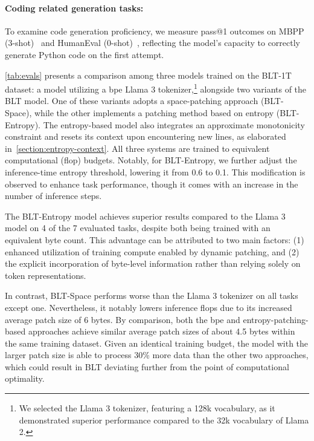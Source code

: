 \paragraph{Coding related generation tasks:}  To examine code generation proficiency, we measure pass@1 outcomes on MBPP (3-shot)~\citep{Eval_MBPP} and HumanEval (0-shot)~\citep{Eval_HumanEval}, reflecting the model's capacity to correctly generate Python code on the first attempt.

\autoref{tab:evals} presents a comparison among three models trained on the {\textsc BLT}-1T dataset: a model utilizing a bpe Llama 3 tokenizer,\footnote{We selected the Llama 3 tokenizer, featuring a 128k vocabulary, as it demonstrated superior performance compared to the 32k vocabulary of Llama 2.} alongside two variants of the {\textsc BLT} model. One of these variants adopts a space-patching approach ({\textsc BLT}-Space), while the other implements a patching method based on entropy ({\textsc BLT}-Entropy). The entropy-based model also integrates an approximate monotonicity constraint and resets its context upon encountering new lines, as elaborated in~\autoref{section:entropy-context}. All three systems are trained to equivalent computational (flop) budgets. Notably, for {\textsc BLT}-Entropy, we further adjust the inference-time entropy threshold, lowering it from 0.6 to 0.1. This modification is observed to enhance task performance, though it comes with an increase in the number of inference steps.

The {\textsc BLT}-Entropy model achieves superior results compared to the Llama 3 model on 4 of the 7 evaluated tasks, despite both being trained with an equivalent byte count. This advantage can be attributed to two main factors: (1) enhanced utilization of training compute enabled by dynamic patching, and (2) the explicit incorporation of byte-level information rather than relying solely on token representations.

In contrast, {\textsc BLT}-Space performs worse than the Llama 3 tokenizer on all tasks except one. Nevertheless, it notably lowers inference flops due to its increased average patch size of 6 bytes. By comparison, both the bpe and entropy-patching-based approaches achieve similar average patch sizes of about 4.5 bytes within the same training dataset. Given an identical training budget, the model with the larger patch size is able to process 30\% more data than the other two approaches, which could result in {\textsc BLT} deviating further from the point of computational optimality.

